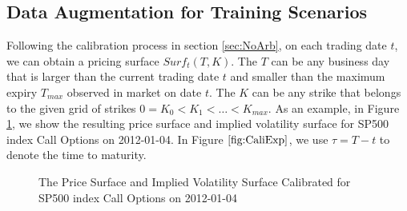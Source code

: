 \documentclass[letterpaper,12pt,titlepage,oneside,final]{book}
\numberwithin{equation}{section}
\theoremstyle{definition}
\begin{document}
\subsection{Data Augmentation for Training Scenarios}
Following the calibration process in section \ref{sec:NoArb}, on each trading date $t$, we can obtain a pricing surface $Surf_{t}(T,K)$. The $T$ can be any business day that is larger than the current trading date $t$ and smaller than the maximum expiry $T_{max}$ observed in market on date $t$. The $K$ can be any strike that belongs to the given grid of strikes $0=K_0<K_1<\dots<K_{max}$. As an example, in Figure \ref{fig:CaliExp}, we show the resulting price surface and implied  volatility surface for SP500 index Call Options  on 2012-01-04. In Figure $\ref{fig:CaliExp}$, we use $\tau=T-t$ to denote the time to maturity.
\begin{figure}[htp!]
	\centering
	\caption{The Price Surface and Implied Volatility Surface Calibrated for SP500 index Call Options on 2012-01-04}
	\label{fig:CaliExp}
\end{figure}
\end{document}
